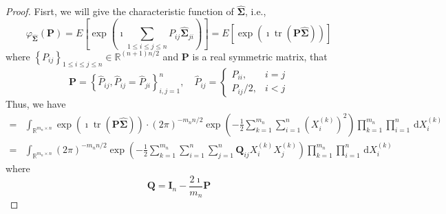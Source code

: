 \begin{proof}
    Fisrt, we will give the characteristic function of $\widehat{\boldsymbol{\Sigma}}$, i.e.,
    \begin{equation*}
        \varphi_{\widehat{\boldsymbol{\Sigma}}}\left(\mathbf{P}\right)=E\left[\exp\left(\imath\sum_{1\leq i\leq j\leq n}P_{ij}\widehat{\boldsymbol{\Sigma}}_{ji}\right)\right]=E\left[\exp\left(\imath\operatorname{tr}\left(\mathbf{P}\widehat{\boldsymbol{\Sigma}}\right)\right)\right]
    \end{equation*}
    where $\left\{P_{ij}\right\}_{1\leq i\leq j\leq n}\in\mathbb{R}^{(n+1)n/2}$ and $\mathbf{P}$ is a real symmetric matrix, that
    \begin{equation*}
        \mathbf{P}=\left\{\widehat{P}_{ij},\widehat{P}_{ij}=\widehat{P}_{ji}\right\}_{i,j=1}^{n},\quad\widehat{P}_{ij}=\begin{cases}P_{ii}, & i=j \\ P_{ij} / 2, & i<j \end{cases}
    \end{equation*}
    Thus, we have
    \begin{equation*}
        \begin{aligned}
            = & \int_{\mathbb{R}^{m_{n}\times n}}\exp\left(\imath\operatorname{tr}\left(\mathbf{P}\widehat{\boldsymbol{\Sigma}}\right)\right)\cdot(2\pi)^{-m_{n}n/2}\exp\left(-\frac{1}{2}\sum_{k=1}^{m_{n}}\sum_{i=1}^{n}\left(X_{i}^{(k)}\right)^{2}\right)\prod_{k=1}^{m_{n}}\prod_{i=1}^{n}\,\mathrm{d}X_{i}^{(k)} \\
            = & \int_{\mathbb{R}^{m_{n}\times n}}(2\pi)^{-m_{n}n/2}\exp\left(-\frac{1}{2}\sum_{k=1}^{m_{n}}\sum_{i=1}^{n}\sum_{j=1}^{n}\mathbf{Q}_{ij}X_{i}^{(k)}X_{j}^{(k)}\right)\prod_{k=1}^{m_{n}}\prod_{i=1}^{n}\,\mathrm{d}X_{i}^{(k)}
        \end{aligned}
    \end{equation*}
    where
    \begin{equation*}
        \mathbf{Q}=\mathbf{I}_{n}-\frac{2\imath}{m_{n}}\mathbf{P}
    \end{equation*}


\end{proof}
